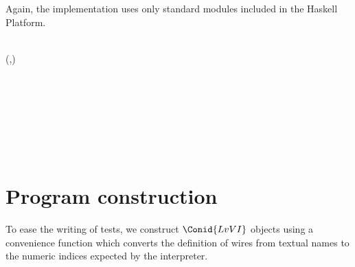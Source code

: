 
Again, the implementation uses only standard modules included in the Haskell Platform.

\begin{hscode}\SaveRestoreHook
{}%
%
\>[B]{}\;\<[E]%
\\
\>[B]{}\;\;(,){}\<[E]%
\\
\>[B]{}\;\<[E]%
\\
\>[B]{}\;\<[E]%
\\
\>[B]{}\;\<[E]%
\ColumnHook
\end{hscode}\resethooks

\begin{hscode}\SaveRestoreHook
{}%
%
%
%
%
\>[B]{}\mathrel{=}{}\<[E]%
\\
\>[B]{}\<[4]%
\>[4]{}\<[E]%
\\
\>[4]{}\<[7]%
\>[7]{}\;\<[E]%
\\
\>[4]{}\<[7]%
\>[7]{}\;\<[E]%
\\
\>[7]{}\<[10]%
\>[10]{}\;\mathrel{=}\<[E]%
\ColumnHook
\end{hscode}\resethooks

\section{Program construction}

To ease the writing of tests, we construct \ensuremath{\Conid{LvVI}} objects using a convenience
function which converts the definition of wires from textual names to the
numeric indices expected by the interpreter.

